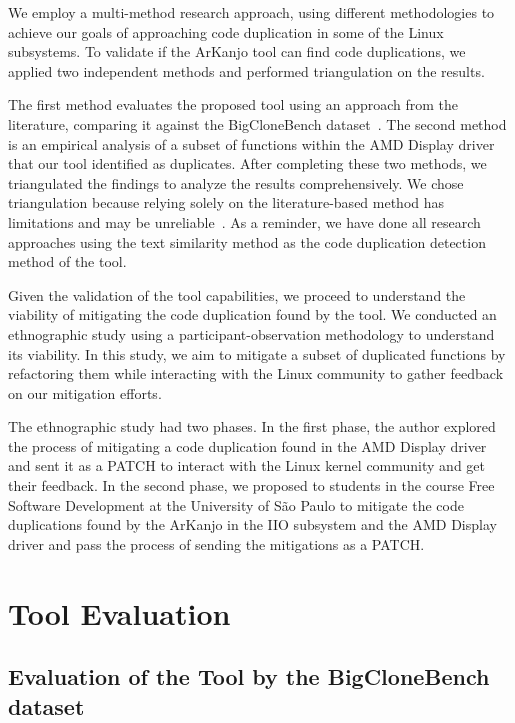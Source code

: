 
We employ a multi-method research approach, using different methodologies to achieve our 
goals of approaching code duplication in some of the Linux subsystems. To validate if the 
ArKanjo tool can find code duplications, we applied two independent methods and performed 
triangulation on the results.

The first method evaluates the proposed tool using an approach from the literature, 
comparing it against the BigCloneBench dataset~\citep{bigclonebench}. 
The second method is an empirical analysis of a subset of functions within the 
AMD Display driver that our tool identified as duplicates. After completing these two 
methods, we triangulated the findings to analyze the results comprehensively. 
We chose triangulation because relying solely on the literature-based method has 
limitations and may be unreliable~\citep{bigfail,litreview}. 
As a reminder, we have done all research approaches using the text similarity method 
as the code duplication detection method of the tool.

Given the validation of the tool capabilities, we proceed to understand the viability 
of mitigating the code duplication found by the tool. We conducted an ethnographic study 
using a participant-observation methodology to understand its viability. In this study, 
we aim to mitigate a subset of duplicated functions by refactoring them while interacting 
with the Linux community to gather feedback on our mitigation efforts.

The ethnographic study had two phases. In the first phase, the author explored the process 
of mitigating a code duplication found in the AMD Display driver and sent it as a PATCH to 
interact with the Linux kernel community and get their feedback. In the second phase, we proposed 
to students in the course Free Software Development at the University of São Paulo to mitigate 
the code duplications found by the ArKanjo in the IIO subsystem and the AMD Display driver and 
pass the process of sending the mitigations as a PATCH.

\section{Tool Evaluation}

\subsection{Evaluation of the Tool by the BigCloneBench dataset}
\label{sec:metbig}


